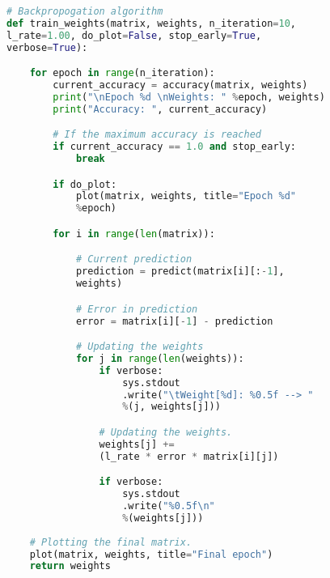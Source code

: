 	\begin{lstlisting}[language=Python, frame=single]
# Backpropogation algorithm
def train_weights(matrix, weights, n_iteration=10, 
l_rate=1.00, do_plot=False, stop_early=True, 
verbose=True):

    for epoch in range(n_iteration):
        current_accuracy = accuracy(matrix, weights)
        print("\nEpoch %d \nWeights: " %epoch, weights)
        print("Accuracy: ", current_accuracy)

        # If the maximum accuracy is reached
        if current_accuracy == 1.0 and stop_early:
            break

        if do_plot:
            plot(matrix, weights, title="Epoch %d" 
            %epoch)

        for i in range(len(matrix)):

            # Current prediction
            prediction = predict(matrix[i][:-1], 
            weights)

            # Error in prediction
            error = matrix[i][-1] - prediction

            # Updating the weights
            for j in range(len(weights)):
                if verbose:
                    sys.stdout
                    .write("\tWeight[%d]: %0.5f --> "
                    %(j, weights[j]))

                # Updating the weights.
                weights[j] += 
                (l_rate * error * matrix[i][j])

                if verbose:
                    sys.stdout
                    .write("%0.5f\n"
                    %(weights[j]))
    
    # Plotting the final matrix.
    plot(matrix, weights, title="Final epoch")
    return weights
	\end{lstlisting}
	
